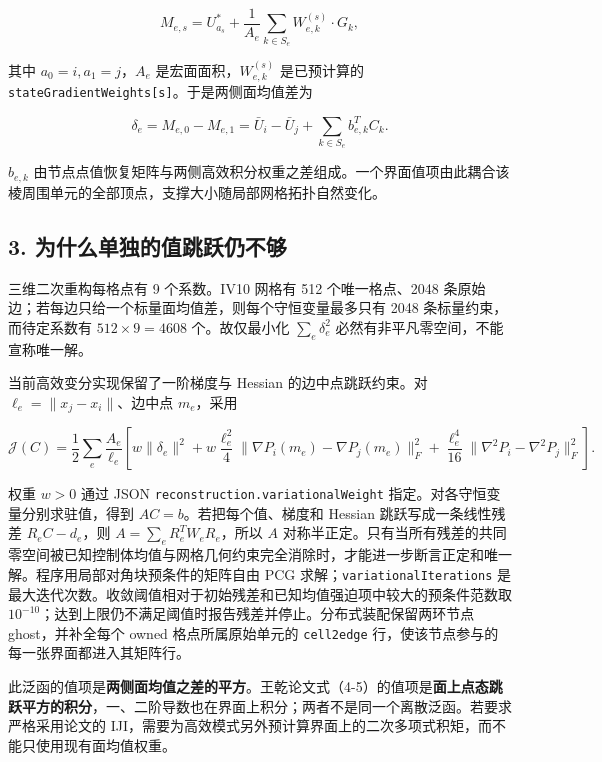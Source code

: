 \documentclass[
]{ctexart}
\begin{document}
\[M_{e,s}=U_{a_s}^*+\frac{1}{A_e}\sum_{k\in S_e}W_{e,k}^{(s)}\cdot G_k,\]

其中 \(a_0=i,a_1=j\)，\(A_e\) 是宏面面积，\(W_{e,k}^{(s)}\) 是已预计算的
\texttt{stateGradientWeights{[}s{]}}。于是两侧面均值差为

\[\delta_e=M_{e,0}-M_{e,1}=\bar U_i-\bar U_j+\sum_{k\in S_e}b_{e,k}^TC_k.\]

\(b_{e,k}\)
由节点点值恢复矩阵与两侧高效积分权重之差组成。一个界面值项由此耦合该棱周围单元的全部顶点，支撑大小随局部网格拓扑自然变化。

\hypertarget{ux4e3aux4ec0ux4e48ux5355ux72ecux7684ux503cux8df3ux8dc3ux4ecdux4e0dux591f}{%
\subsection{3.
为什么单独的值跳跃仍不够}\label{ux4e3aux4ec0ux4e48ux5355ux72ecux7684ux503cux8df3ux8dc3ux4ecdux4e0dux591f}}

三维二次重构每格点有 9 个系数。IV10 网格有 512 个唯一格点、2048
条原始边；若每边只给一个标量面均值差，则每个守恒变量最多只有 2048
条标量约束，而待定系数有 \(512\times9=4608\) 个。故仅最小化
\(\sum_e\delta_e^2\) 必然有非平凡零空间，不能宣称唯一解。

当前高效变分实现保留了一阶梯度与 Hessian 的边中点跳跃约束。对
\(\ell_e=\lVert x_j-x_i\rVert\)、边中点 \(m_e\)，采用

\[
\mathcal J(C)=\frac12\sum_e\frac{A_e}{\ell_e}\left[
w\lVert\delta_e\rVert^2+
w\frac{\ell_e^2}{4}\lVert\nabla P_i(m_e)-\nabla P_j(m_e)\rVert_F^2+
\frac{\ell_e^4}{16}\lVert\nabla^2P_i-\nabla^2P_j\rVert_F^2
\right].
\]

权重 \(w>0\) 通过 JSON \texttt{reconstruction.variationalWeight}
指定。对各守恒变量分别求驻值，得到 \(AC=b\)。若把每个值、梯度和 Hessian
跳跃写成一条线性残差 \(R_eC-d_e\)，则 \(A=\sum_e R_e^TW_eR_e\)，所以
\(A\)
对称半正定。只有当所有残差的共同零空间被已知控制体均值与网格几何约束完全消除时，才能进一步断言正定和唯一解。程序用局部对角块预条件的矩阵自由
PCG 求解；\texttt{variationalIterations}
是最大迭代次数。收敛阈值相对于初始残差和已知均值强迫项中较大的预条件范数取
\(10^{-10}\)；达到上限仍不满足阈值时报告残差并停止。分布式装配保留两环节点
ghost，并补全每个 owned 格点所属原始单元的 \texttt{cell2edge}
行，使该节点参与的每一张界面都进入其矩阵行。

此泛函的值项是\textbf{两侧面均值之差的平方}。王乾论文式（4-5）的值项是\textbf{面上点态跳跃平方的积分}，一、二阶导数也在界面上积分；两者不是同一个离散泛函。若要求严格采用论文的
IJI，需要为高效模式另外预计算界面上的二次多项式积矩，而不能只使用现有面均值权重。
\end{document}
